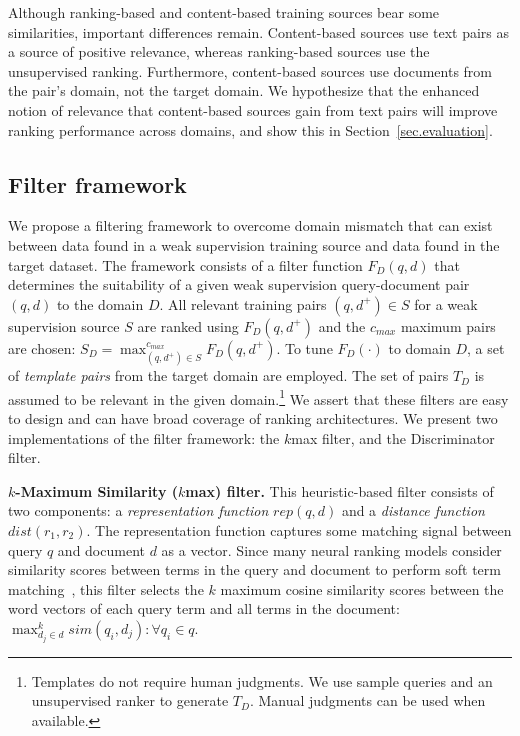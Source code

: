 Although ranking-based and content-based training sources bear some similarities, important differences remain. Content-based sources use text pairs as a source of positive relevance, whereas ranking-based sources use the unsupervised ranking. Furthermore, content-based sources use documents from the pair's domain, not the target domain. We hypothesize that the enhanced notion of relevance that content-based sources gain from text pairs will improve ranking performance across domains, and show this in Section~\ref{sec.evaluation}.






\subsection{Filter framework}\label{sec.method.filters}
We propose a filtering framework to overcome domain mismatch that can exist between data found in a weak supervision training source and data found in the target dataset. The framework consists of a filter function $F_D(q,d)$ that determines the suitability of a given weak supervision query-document pair $(q,d)$ to the domain $D$. All relevant training pairs $(q,d^+)\in S$ for a weak supervision source $S$ are ranked using $F_D(q,d^+)$ and the $c_{max}$ maximum pairs are chosen: $
S_D=\max^{c_{max}}_{(q,d^+)\in S}F_D(q,d^+)
$. To tune $F_D(\cdot)$ to domain $D$, a set of \textit{template pairs} from the target domain are employed. The set of pairs $T_D$ %
is assumed to be relevant in the given domain.\footnote{Templates do not require human judgments. We use sample queries and an unsupervised ranker to generate $T_D$. Manual judgments can be used when available.} We assert that these filters are easy to design and can have broad coverage of ranking architectures. We present two implementations of the filter framework: the $k$max filter, and the Discriminator filter.

\textbf{$k$-Maximum Similarity ($k$max) filter.}
This heuristic-based filter consists of two components: a \textit{representation function} $\mathit{rep}(q,d)$ and a \textit{distance function} $\mathit{dist}(r_1,r_2)$.
The representation function captures some matching signal between query $q$ and document $d$ as a vector. Since many neural ranking models consider similarity scores between terms in the query and document to perform soft term matching~\cite{hui2017pacrr,convknrm,xiong2017end,guo2016deep}, this filter selects the $k$ maximum cosine similarity scores between the word vectors of each query term and all terms in the document:
$\max_{d_j\in d}^ksim(q_i, d_j) : \forall q_i \in q$.


